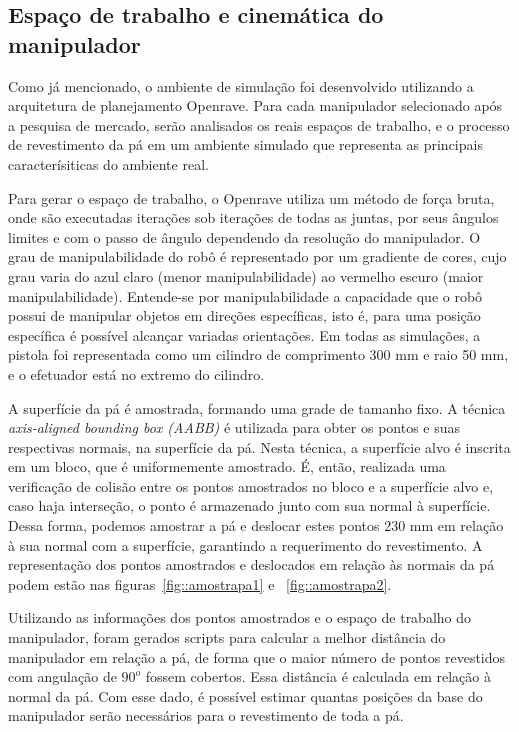 \subsection{Espaço de trabalho e cinemática do
manipulador}\label{sec::cinematica} 

Como já mencionado, o ambiente de simulação
foi desenvolvido utilizando a arquitetura de planejamento Openrave. Para cada manipulador selecionado após a
pesquisa de mercado, serão analisados os reais espaços de trabalho, e o processo de
revestimento da pá em um ambiente simulado que representa as principais
caracterísiticas do ambiente real.

Para gerar o espaço de trabalho, o Openrave utiliza um método de força bruta,
onde são executadas iterações sob iterações de todas as juntas, por seus ângulos
limites e com o passo de ângulo dependendo da resolução do manipulador. O grau
de manipulabilidade do robô é representado por um gradiente de cores, cujo grau
varia do azul claro (menor manipulabilidade) ao vermelho escuro (maior manipulabilidade).
Entende-se por manipulabilidade a capacidade que o robô possui de manipular
objetos em direções específicas, isto é, para uma posição específica é
possível alcançar variadas orientações. Em todas as simulações, a pistola foi
representada como um cilindro de comprimento 300 mm e raio 50 mm, e o efetuador está no extremo do cilindro.

A superfície da pá é amostrada, formando uma grade de tamanho fixo. A técnica
\textit{axis-aligned bounding box (AABB)} é utilizada para obter os
pontos e suas respectivas normais, na superfície da pá. Nesta técnica, a
superfície alvo é inscrita em um bloco, que é uniformemente amostrado. É, então,
realizada uma verificação de colisão entre os pontos amostrados no bloco e a
superfície alvo e, caso haja interseção, o ponto é armazenado junto com sua
normal à superfície. Dessa forma, podemos amostrar a pá e deslocar estes pontos
230 mm em relação à sua normal com a superfície, garantindo a requerimento do
revestimento. A representação dos pontos amostrados e deslocados em relação às
normais da pá podem estão nas figuras~\ref{fig::amostrapa1} e ~\ref{fig::amostrapa2}. 

Utilizando as informações dos pontos amostrados e o espaço de trabalho do
manipulador, foram gerados scripts para calcular a
melhor distância do manipulador em relação a pá, de forma que o maior número de
pontos revestidos com angulação de $90^o$ fossem cobertos.
Essa distância é calculada em relação à normal da pá. Com esse dado, é possível estimar quantas posições da base do
manipulador serão necessários para o revestimento de toda a pá.

